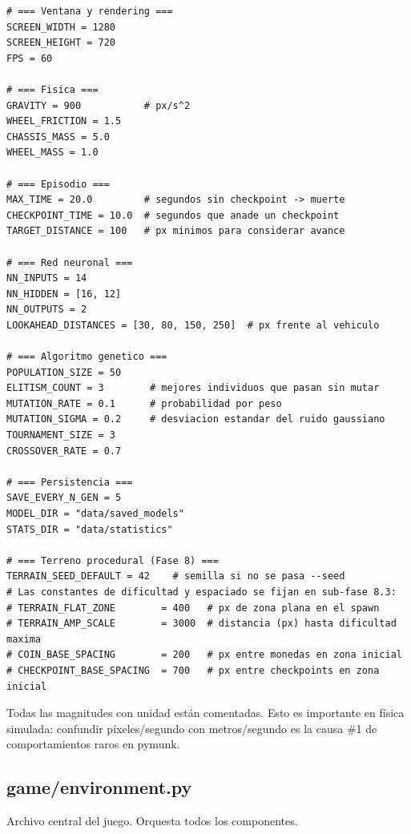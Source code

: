 \documentclass[11pt,a4paper]{article}
\begin{document}
\begin{lstlisting}
# === Ventana y rendering ===
SCREEN_WIDTH = 1280
SCREEN_HEIGHT = 720
FPS = 60

# === Fisica ===
GRAVITY = 900           # px/s^2
WHEEL_FRICTION = 1.5
CHASSIS_MASS = 5.0
WHEEL_MASS = 1.0

# === Episodio ===
MAX_TIME = 20.0         # segundos sin checkpoint -> muerte
CHECKPOINT_TIME = 10.0  # segundos que anade un checkpoint
TARGET_DISTANCE = 100   # px minimos para considerar avance

# === Red neuronal ===
NN_INPUTS = 14
NN_HIDDEN = [16, 12]
NN_OUTPUTS = 2
LOOKAHEAD_DISTANCES = [30, 80, 150, 250]  # px frente al vehiculo

# === Algoritmo genetico ===
POPULATION_SIZE = 50
ELITISM_COUNT = 3        # mejores individuos que pasan sin mutar
MUTATION_RATE = 0.1      # probabilidad por peso
MUTATION_SIGMA = 0.2     # desviacion estandar del ruido gaussiano
TOURNAMENT_SIZE = 3
CROSSOVER_RATE = 0.7

# === Persistencia ===
SAVE_EVERY_N_GEN = 5
MODEL_DIR = "data/saved_models"
STATS_DIR = "data/statistics"

# === Terreno procedural (Fase 8) ===
TERRAIN_SEED_DEFAULT = 42    # semilla si no se pasa --seed
# Las constantes de dificultad y espaciado se fijan en sub-fase 8.3:
# TERRAIN_FLAT_ZONE        = 400   # px de zona plana en el spawn
# TERRAIN_AMP_SCALE        = 3000  # distancia (px) hasta dificultad maxima
# COIN_BASE_SPACING        = 200   # px entre monedas en zona inicial
# CHECKPOINT_BASE_SPACING  = 700   # px entre checkpoints en zona inicial
\end{lstlisting}

\begin{notabox}
Todas las magnitudes con unidad están comentadas. Esto es importante en física simulada: confundir píxeles/segundo con metros/segundo es la causa \#1 de comportamientos raros en pymunk.
\end{notabox}

\subsection{game/environment.py}

Archivo central del juego. Orquesta todos los componentes.
\end{document}
